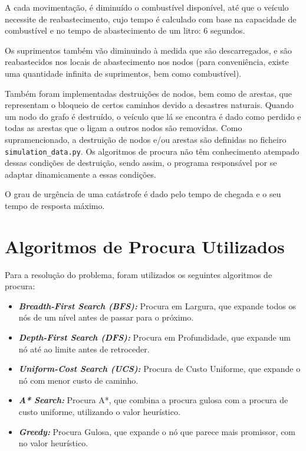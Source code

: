 \documentclass[a4paper,12pt]{scrreprt}
\begin{document}
A cada movimentação, é diminuído o combustível disponível, até que o veículo necessite de reabastecimento, cujo tempo é
calculado com base na capacidade de combustível e no tempo de abastecimento de um litro: 6 segundos.

Os suprimentos também vão diminuindo à medida que são descarregados, e são reabastecidos
nos locais de abastecimento nos nodos (para conveniência, existe uma quantidade infinita de suprimentos, bem como combustível).

Também foram implementadas destruições de nodos, bem como de arestas, que representam o bloqueio de certos caminhos devido a desastres naturais.
Quando um nodo do grafo é destruído, o veículo que lá se encontra é dado como perdido e todas as arestas que o ligam a outros nodos
são removidas. Como supramencionado, a destruição de nodos e/ou arestas são definidas no ficheiro \texttt{simulation\_data.py}.
Os algoritmos de procura não têm conhecimento atempado dessas condições de destruição, sendo assim, o programa responsável por
se adaptar dinamicamente a essas condições.

O grau de urgência de uma catástrofe é dado pelo tempo de chegada e o seu tempo de resposta máximo.

\section{Algoritmos de Procura Utilizados}

Para a resolução do problema, foram utilizados os seguintes algoritmos de procura:

\begin{itemize}
    \item \textbf{\textit{Breadth-First Search (BFS):}} Procura em Largura, que expande todos os nós de um nível antes de passar para o próximo.
    \item \textbf{\textit{Depth-First Search (DFS):}} Procura em Profundidade, que expande um nó até ao limite antes de retroceder.
    \item \textbf{\textit{Uniform-Cost Search (UCS):}} Procura de Custo Uniforme, que expande o nó com menor custo de caminho.
    \item \textbf{\textit{A* Search:}} Procura A*, que combina a procura gulosa com a procura de custo uniforme, utilizando o valor heurístico.
    \item \textbf{\textit{Greedy:}} Procura Gulosa, que expande o nó que parece mais promissor, com no valor heurístico.
\end{itemize}
\end{document}
